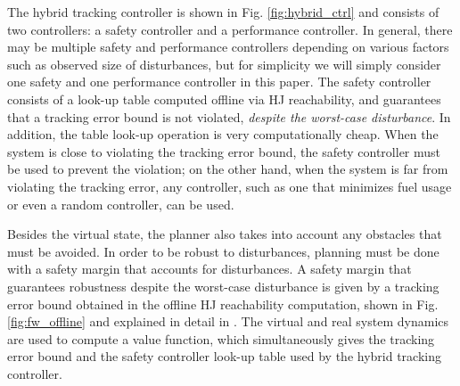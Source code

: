 The hybrid tracking controller is shown in Fig. \ref{fig:hybrid_ctrl} and consists of two controllers: a safety controller and a performance controller. In general, there may be multiple safety and performance controllers depending on various factors such as observed size of disturbances, but for simplicity we will simply consider one safety and one performance controller in this paper. The safety controller consists of a look-up table computed offline via HJ reachability, and guarantees that a tracking error bound is not violated, \textit{despite the worst-case disturbance}. In addition, the table look-up operation is very computationally cheap. When the system is close to violating the tracking error bound, the safety controller must be used to prevent the violation; on the other hand, when the system is far from violating the tracking error, any controller, such as one that minimizes fuel usage or even a random controller, can be used.


Besides the virtual state, the planner also takes into account any obstacles that must be avoided. In order to be robust to disturbances, planning must be done with a safety margin that accounts for disturbances. A safety margin that guarantees robustness despite the worst-case disturbance is given by a tracking error bound obtained in the offline HJ reachability computation, shown in Fig. \ref{fig:fw_offline} and explained in detail in . The virtual and real system dynamics are used to compute a value function, which simultaneously gives the tracking error bound and the safety controller look-up table used by the hybrid tracking controller.
%
%
%
%
%

